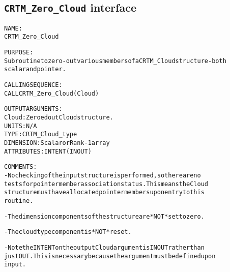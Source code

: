 \subsection{\texttt{CRTM\_Zero\_Cloud} interface}
  \label{sec:CRTM_Zero_Cloud_interface}
  \begin{alltt}
 
  NAME:
        CRTM_Zero_Cloud
  
  PURPOSE:
        Subroutine to zero-out various members of a CRTM_Cloud structure - both
        scalar and pointer.
 
  CALLING SEQUENCE:
        CALL CRTM_Zero_Cloud( Cloud )
 
  OUTPUT ARGUMENTS:
        Cloud:        Zeroed out Cloud structure.
                      UNITS:      N/A
                      TYPE:       CRTM_Cloud_type
                      DIMENSION:  Scalar or Rank-1 array
                      ATTRIBUTES: INTENT(IN OUT)
 
  COMMENTS:
        - No checking of the input structure is performed, so there are no
          tests for pointer member association status. This means the Cloud
          structure must have allocated pointer members upon entry to this
          routine.
 
        - The dimension components of the structure are *NOT* set to zero.
 
        - The cloud type component is *NOT* reset.
 
        - Note the INTENT on the output Cloud argument is IN OUT rather than
          just OUT. This is necessary because the argument must be defined upon
          input.
 
  \end{alltt}
